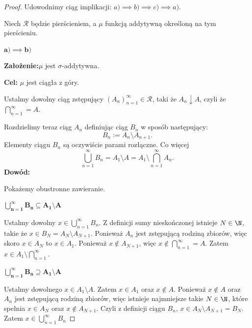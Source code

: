 \begin{proof}
	Udowodnimy ciąg implikacji: $a) \implies b) \implies c) \implies a)$.

\noindent 	Niech $\mathcal{R}$ będzie pierścieniem, a $\mu$ funkcją addytywną określoną na tym pierścieniu. 

\noindent \textbf{$\bm{ a) \implies b) } $} 

	\textbf{Założenie:}$\mu$ jest $\sigma$-addytywna. 

	\textbf{Cel:} $\mu$ jest ciągła z góry.

	Ustalmy dowolny ciąg zstępujący $\left( A_{n} \right)_{n=1}^{\infty}\in \mathcal{R}$, taki że $A_{n}\downarrow A$, czyli że $\bigcap_{n=1} ^{\infty} = A$. 

	Rozdzielimy teraz ciąg $A_{n}$ definiując ciąg $B_{n}$ w sposób następujący:
	\[
	B_{n} := A_{n} \setminus A_{n+1}
	.\] 
	Elementy ciągu $B_{n}$ są oczywiście parami rozłączne. Co więcej 
	 \[
	\bigcup_{n=1} ^{\infty} B_{n} = A_{1} \setminus A = A_{1} \setminus \bigcap_{n=1}^{\infty}A_{n}
	.\] 
\noindent \textbf{Dowód:}

Pokażemy obustronne zawieranie.

\noindent $ \bm{\bigcup_{n=1} ^{\infty} B_{n} \subseteq    A_{1} \setminus A}$

	Ustalmy dowolny $x\in \bigcup_{n=1}^{\infty}B_{n}$. Z definicji sumy nieskończonej istnieje $N\in \N $, takie że $x\in B_{N} = A_{N}\setminus A_{N+1}$. Ponieważ $A_{n}$ jest zstępującą rodziną zbiorów, więc skoro $x\in A_{N}$ to $x\in A_1$. Ponieważ $x\not\in  A_{N+1}$, więc $x\not\in \bigcap_{n=1}^{\infty}= A $. Zatem $x \in A_{1}\setminus \bigcap_{n=1} ^{\infty}$.

	\noindent $ \bm{\bigcup_{n=1} ^{\infty} B_{n}  \supseteq    A_{1} \setminus A}$

	Ustalmy dowolnego $x\in A_{1}\setminus A$. Zatem $x\in A_1$ oraz $x\not\in A$. Ponieważ $x\not\in A$ oraz $A_{n}$ jest zstępującą rodziną zbiorów, więc istnieje najmniejsze takie $N\in \N$, które spełnia $x\in A_{N}$ oraz $x\not\in A_{N+1}$. Czyli z definicji ciągu $B_{n}$, $x\in A_{N}\setminus A_{N+1} = B_{N}$. Zatem $x\in \bigcup_{n=1} ^{\infty}B_{n}$


\end{proof}
